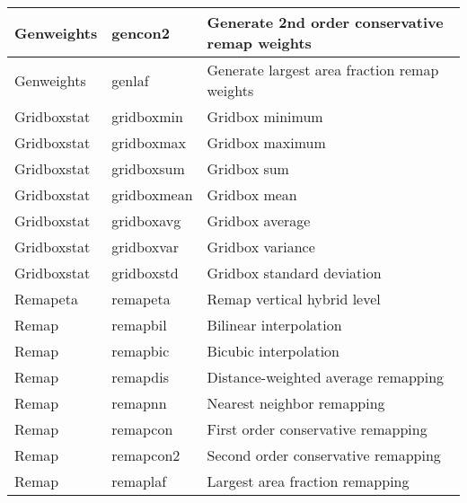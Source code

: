 \begin{tabular}[t]{|l|>{\columncolor{pcolor1}}l|l|}
Genweights   & gencon2         & Generate 2nd order conservative remap weights \\ \hline
Genweights   & genlaf          & Generate largest area fraction remap weights \\ \hline
Gridboxstat  & gridboxmin      & Gridbox minimum \\ \hline
Gridboxstat  & gridboxmax      & Gridbox maximum \\ \hline
Gridboxstat  & gridboxsum      & Gridbox sum \\ \hline
Gridboxstat  & gridboxmean     & Gridbox mean \\ \hline
Gridboxstat  & gridboxavg      & Gridbox average \\ \hline
Gridboxstat  & gridboxvar      & Gridbox variance \\ \hline
Gridboxstat  & gridboxstd      & Gridbox standard deviation \\ \hline
Remapeta     & remapeta        & Remap vertical hybrid level \\ \hline
Remap        & remapbil        & Bilinear interpolation \\ \hline
Remap        & remapbic        & Bicubic interpolation \\ \hline
Remap        & remapdis        & Distance-weighted average remapping \\ \hline
Remap        & remapnn         & Nearest neighbor remapping \\ \hline
Remap        & remapcon        & First order conservative remapping \\ \hline
Remap        & remapcon2       & Second order conservative remapping \\ \hline
Remap        & remaplaf        & Largest area fraction remapping \\ \hline

\end{tabular}
